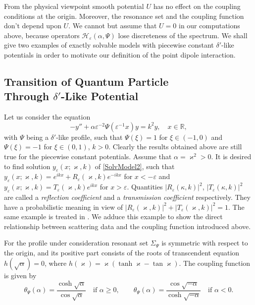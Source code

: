 \documentclass[11pt,english]{amsart}%
\DeclareMathOperator*{\csh}{cosh} \DeclareMathOperator*{\snh}{sinh}
\DeclareMathOperator*{\tnh}{tanh} \DeclareMathOperator*{\tng}{tan}
\begin{document}
From the physical viewpoint  smooth potential $U$ has no effect on the coupling conditions at the origin.
Moreover,  the resonance set and the coupling function don't depend upon $U$.
We cannot but assume that $U=0$ in our computations above, because operators $\mathcal{H}_{\varepsilon}(\alpha,\Psi)$
lose discreteness of  the spectrum.  We shall give two examples of exactly solvable models with  piecewise constant $\delta'$-like potentials in order to motivate our definition of the point dipole interaction.


\subsection{Transition of Quantum Particle\\ Through $\delta'$-Like Potential}\label{subsecScattering}
Let us consider the equation
\begin{equation}\label{SolvModel2}
    -y''+\alpha\varepsilon^{-2}\Psi(\varepsilon^{-1}x)y=k^2 y,\quad x\in\mathbb{R},
\end{equation}
with $\Psi$ being a $\delta'$-like profile, such that  $\Psi(\xi)=1$ for $\xi\in(-1,0)$ and
$\Psi(\xi)=-1$ for $\xi\in(0,1)$, $k>0$. Clearly the results obtained above are still true for the piecewise constant potentials. Assume that $\alpha=\varkappa^2>0$. It is desired to find solution $y_\varepsilon(x;\varkappa,k)$ of \eqref{SolvModel2}, such that $y_\varepsilon(x;\varkappa,k)=e^{ikx}+R_\varepsilon(\varkappa,k)e^{-ikx}$ for
$x<-\varepsilon$ and $y_\varepsilon(x;\varkappa,k)=T_\varepsilon(\varkappa,k)e^{ikx}$ for
$x>\varepsilon$.
Quantities $|R_\varepsilon(\kappa,k)|^2$, $|T_\varepsilon(\kappa,k)|^2$ are called a \emph{reflection coefficient} and  a \emph{transmission coefficient} respectively. They have a probabilistic meaning in view of
$|R_\varepsilon(\varkappa,k)|^2+|T_\varepsilon(\varkappa,k)|^2=1$. The same example is treated in   \cite{ChristianZolotarIermak03}. We adduce this example to show the direct relationship between  scattering data and the coupling function introduced above.

For the profile  under consideration  resonant set  $\Sigma_\Psi$ is symmetric with respect to the origin, and
its positive part consists of the  roots of transcendent equation
$h(\sqrt{\alpha})=0$, where $h(\varkappa)=\varkappa(\tnh\varkappa-\tng\varkappa)$. The coupling function is given by
\begin{equation}\label{ThetaForSolvModel}
    \theta_\Psi (\alpha)=\frac{\csh\sqrt{\alpha}}{\cos\sqrt{\alpha}}\quad\text{if }\alpha\geq 0,\qquad
    \theta_\Psi (\alpha)=\frac{\cos\sqrt{-\alpha}}{\csh\sqrt{-\alpha}}\quad\text{if }\alpha<0.
\end{equation}
\end{document}
